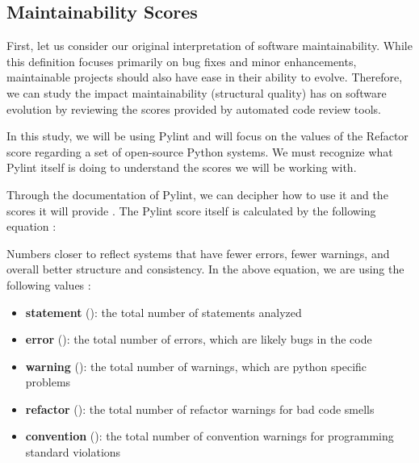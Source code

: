 \subsection{Maintainability Scores} \label{subMaintainabilityScores}


First, let us consider our original interpretation of software maintainability. While this definition focuses primarily on bug fixes and minor enhancements, maintainable projects should also have ease in their ability to evolve. Therefore, we can study the impact maintainability (structural quality) has on software evolution by reviewing the scores provided by automated code review tools.

In this study, we will be using Pylint and will focus on the values of the Refactor score regarding a set of open-source Python systems. We must recognize what Pylint itself is doing to understand the scores we will be working with.

Through the documentation of Pylint, we can decipher how to use it and the scores it will provide \cite{pylint:main}. The Pylint score itself is calculated by the following equation \cite{pylint:score}:

\vspace{0.25cm}
\begin{center}
\end{center}
\vspace{0.25cm}

Numbers closer to  reflect systems that have fewer errors, fewer warnings, and overall better structure and consistency. In the above equation, we are using the following values \cite{pylint:docs}:
\begin{singlespace}
  \begin{itemize}
    \item \textbf{statement} (): the total number of statements analyzed
    \item \textbf{error} (): the total number of errors, which are likely bugs in the code
    \item \textbf{warning} (): the total number of warnings, which are python specific problems
    \item \textbf{refactor} (): the total number of refactor warnings for bad code smells
    \item \textbf{convention} (): the total number of convention warnings for programming standard violations
  \end{itemize}
\end{singlespace}

